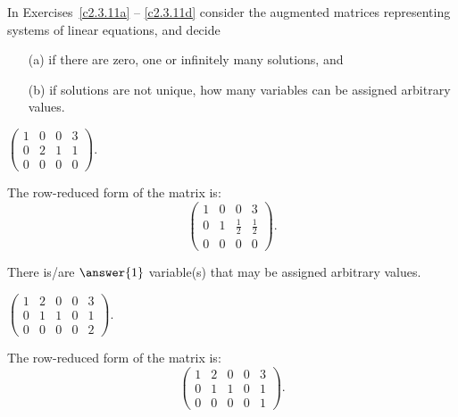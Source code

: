 \documentclass{ximera}
\begin{document}
\noindent In Exercises~\ref{c2.3.11a} -- \ref{c2.3.11d} consider the
augmented matrices representing systems of linear equations, and decide
\begin{itemize}
\item[(a)] if there are zero, one or infinitely many solutions, and
\item[(b)] if solutions are not unique, how many variables can be
assigned arbitrary values.
\end{itemize}
\begin{exercise} \label{c2.3.11a}
$\left(\begin{array}{ccc|c} 1 & 0 & 0 &3 \\0 & 2 & 1 & 1\\ 0 & 0 & 0 & 0
       \end{array}\right)$.
     \begin{multipleChoice}
     \end{multipleChoice}
     \begin{hint}
       The row-reduced form of the matrix is:
\[
\left(\begin{array}{rrr|r} 1 & 0 & 0 & 3 \\ 0 & 1 &
\frac{1}{2} & \frac{1}{2} \\ 0 & 0 & 0 & 0\end{array}\right).
\]
     \end{hint}
     \begin{exercise}
       There is/are $\answer{1}$ variable(s) that may be assigned arbitrary values.
     \end{exercise}
\end{exercise}
\begin{exercise} \label{c2.3.11b}
$\left(\begin{array}{cccc|c} 1 & 2 & 0 & 0 & 3\\ 0 & 1 & 1 & 0 & 1\\
         0 & 0 & 0 & 0 & 2 \end{array}\right)$.
     \begin{multipleChoice}
     \end{multipleChoice}
     \begin{hint}
       The row-reduced form of the matrix is:
\[
\left(\begin{array}{rrrr|r} 1 & 2 & 0 & 0 & 3 \\
0 & 1 & 1 & 0 & 1 \\ 0 & 0 & 0 & 0 & 1\end{array}\right).
\]
     \end{hint}
\end{exercise}
\end{document}
